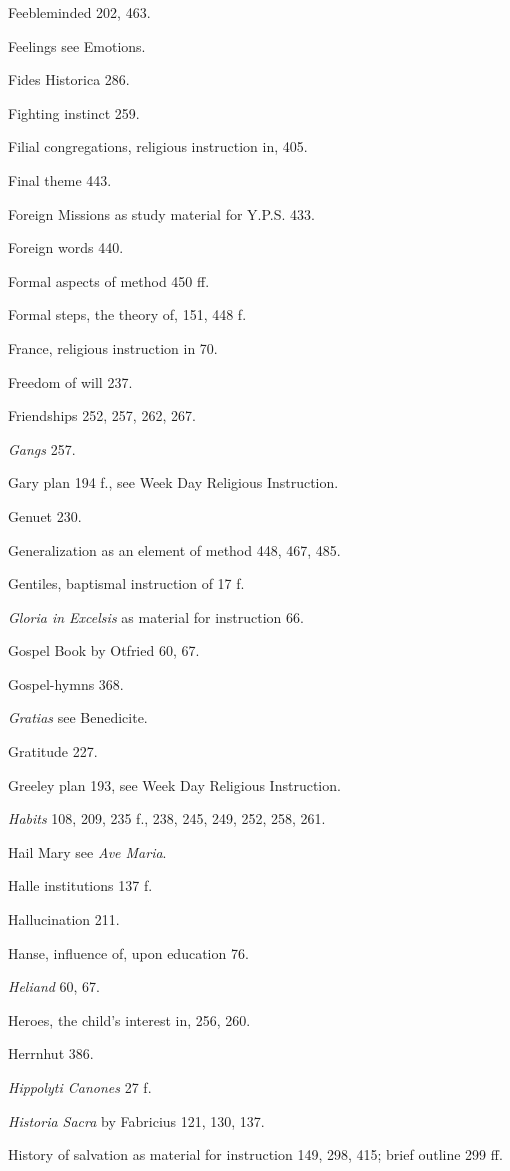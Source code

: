 Feebleminded 202, 463.

Feelings see Emotions.

Fides Historica 286.

Fighting instinct 259.

Filial congregations, religious instruction in, 405.

Final theme 443.

Foreign Missions as study material for Y.P.S. 433.

Foreign words 440.

Formal aspects of method 450 ff.

Formal steps, the theory of, 151, 448 f.

France, religious instruction in 70.

Freedom of will 237.

Friendships 252, 257, 262, 267.

\emph{Gangs} 257.

Gary plan 194 f., see Week Day Religious Instruction.

Genuet 230.

Generalization as an element of method 448, 467, 485.

Gentiles, baptismal instruction of 17 f.

\emph{Gloria in Excelsis} as material for instruction 66.

Gospel Book by Otfried 60, 67.

Gospel-hymns 368.

\emph{Gratias} see Benedicite.

Gratitude 227.

Greeley plan 193, see Week Day Religious Instruction.

\emph{Habits} 108, 209, 235 f., 238, 245, 249, 252, 258, 261.

Hail Mary see \emph{Ave Maria}.

Halle institutions 137 f.

Hallucination 211.

Hanse, influence of, upon education 76.

\emph{Heliand} 60, 67.

Heroes, the child's interest in, 256, 260.

Herrnhut 386.

\emph{Hippolyti Canones} 27 f.

\emph{Historia Sacra} by Fabricius 121, 130, 137.

History of salvation as material for instruction 149, 298, 415; brief outline 299 ff.

